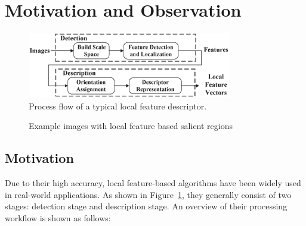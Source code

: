 \section{Motivation and Observation}
\label{sec:observation}

\begin{figure}
	\centering
	\includegraphics[width=3.5in]{images/fig-workflow.eps}
	\caption{Process flow of a typical local feature descriptor.}
	\label{fig:workflow}
\end{figure}

\begin{figure}[!t]
	\centering
	\hfil
	\caption{Example images with local feature based salient regions}
	\label{fig:observations}
\end{figure}

\subsection{Motivation}

Due to their high accuracy, local feature-based algorithms have been widely used in real-world applications.  As shown in Figure~\ref{fig:workflow}, they generally consist of two stages: detection stage and description stage.  An overview of their processing workflow is shown as follows:

